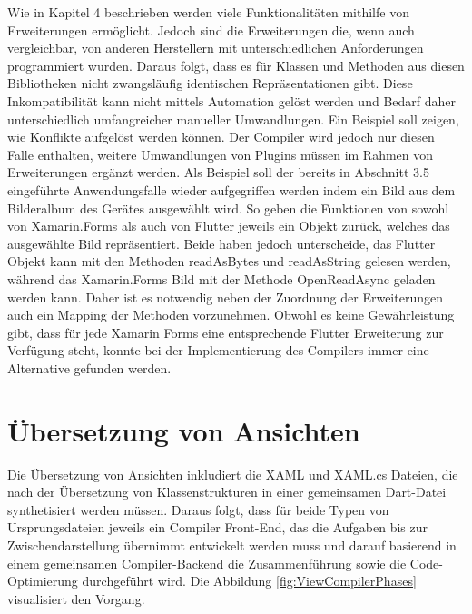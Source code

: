 Wie in Kapitel 4 beschrieben werden viele Funktionalitäten mithilfe von Erweiterungen ermöglicht.  Jedoch sind die Erweiterungen die,  wenn auch vergleichbar, von anderen
Herstellern mit unterschiedlichen Anforderungen programmiert wurden.  Daraus folgt,  dass es für Klassen und Methoden aus diesen Bibliotheken nicht zwangsläufig identischen Repräsentationen gibt.  Diese Inkompatibilität kann nicht mittels Automation gelöst werden und Bedarf daher unterschiedlich umfangreicher manueller Umwandlungen.  Ein Beispiel soll zeigen,  wie Konflikte aufgelöst werden können.  Der Compiler wird jedoch nur diesen Falle enthalten, weitere Umwandlungen von Plugins müssen im Rahmen von Erweiterungen ergänzt werden.  Als Beispiel soll der bereits in Abschnitt 3.5 eingeführte Anwendungsfalle wieder aufgegriffen werden indem ein Bild aus dem Bilderalbum des Gerätes ausgewählt wird.  So geben die Funktionen von sowohl von Xamarin.Forms als auch von Flutter jeweils ein Objekt zurück, welches das ausgewählte Bild repräsentiert.  Beide haben jedoch unterscheide,   das Flutter Objekt kann mit den Methoden readAsBytes und readAsString gelesen werden,  während das Xamarin.Forms Bild mit der Methode OpenReadAsync geladen werden kann.  Daher ist es notwendig neben der Zuordnung der Erweiterungen auch ein Mapping der Methoden vorzunehmen. Obwohl es keine Gewährleistung gibt, dass für jede Xamarin Forms eine entsprechende Flutter 
Erweiterung zur Verfügung steht, konnte bei der Implementierung des Compilers immer eine  Alternative gefunden werden.


\section{Übersetzung von Ansichten}
Die Übersetzung von Ansichten inkludiert die XAML und XAML.cs Dateien, die nach der Übersetzung von Klassenstrukturen in einer gemeinsamen Dart-Datei synthetisiert werden müssen.  Daraus folgt,  dass für beide Typen von Ursprungsdateien jeweils ein Compiler Front-End,  das die Aufgaben bis zur Zwischendarstellung übernimmt entwickelt werden muss und darauf basierend in einem gemeinsamen Compiler-Backend die Zusammenführung sowie die Code-Optimierung durchgeführt wird.  Die Abbildung  \ref{fig:ViewCompilerPhases} visualisiert den Vorgang. 

